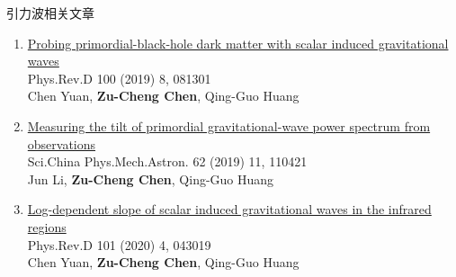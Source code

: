 \documentclass[xcolor={svgnames},compress]{beamer}
\let\olditem\item
\renewcommand{\item}{%
    \olditem\vspace{\fill}}
\begin{document}
\begin{frame}{引力波相关文章}
    \vspace{-2mm}
    \begin{enumerate}
        \item \href{https://journals.aps.org/prd/abstract/10.1103/PhysRevD.100.081301}{Probing primordial-black-hole dark matter with scalar induced gravitational waves} \\
        Phys.Rev.D 100 (2019) 8, 081301\\
        Chen Yuan, \textbf{Zu-Cheng Chen}, Qing-Guo Huang    
        
        \item \href{https://link.springer.com/article/10.1007/s11433-019-9605-5}{Measuring the tilt of primordial gravitational-wave power spectrum from observations}\\
        Sci.China Phys.Mech.Astron. 62 (2019) 11, 110421\\
        Jun Li, \textbf{Zu-Cheng Chen}, Qing-Guo Huang
        
        \item \href{https://journals.aps.org/prd/abstract/10.1103/PhysRevD.101.043019}{Log-dependent slope of scalar induced gravitational waves in the infrared regions}\\
            Phys.Rev.D 101 (2020) 4, 043019\\ 
        Chen Yuan, \textbf{Zu-Cheng Chen}, Qing-Guo Huang    
          
        
    \end{enumerate} 
\end{frame}
\end{document}
